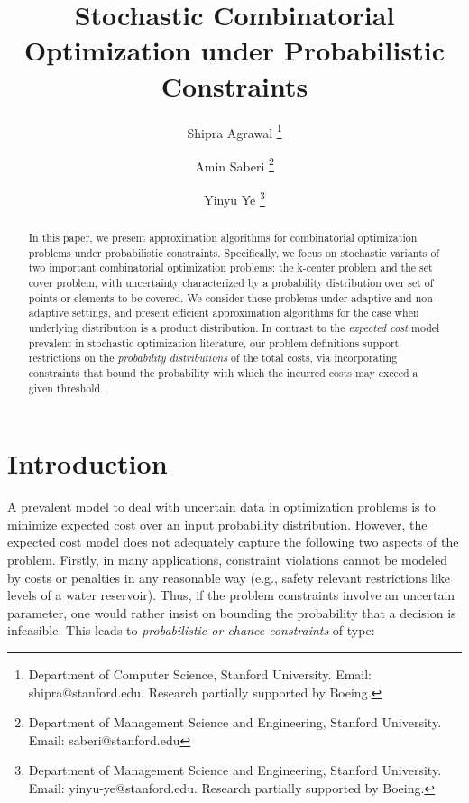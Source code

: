 \documentclass[11pt,onecolumn]{article}
\newcommand{\newtext}[1]{{#1}}
\begin{document}
\title{Stochastic Combinatorial Optimization under Probabilistic Constraints}
\author{
Shipra Agrawal \thanks{Department of Computer Science, Stanford University. 
Email: shipra@stanford.edu. Research partially supported by Boeing.}
    \and 
Amin Saberi \thanks{Department of Management Science and Engineering, Stanford University. Email: saberi@stanford.edu}
\and
Yinyu Ye \thanks{Department of Management Science and Engineering,
Stanford University. 
Email: yinyu-ye@stanford.edu. Research partially supported by Boeing.}
} 
\maketitle
\date{ }
\begin{abstract}
{\small
In this paper, we present approximation algorithms for combinatorial optimization problems under probabilistic constraints. Specifically, we focus on stochastic variants of two important combinatorial optimization problems: the k-center problem and the set cover problem, with uncertainty characterized by a probability distribution over set of points or elements to be covered. 
We consider these problems under adaptive and non-adaptive settings, and present efficient approximation algorithms for the case when underlying distribution is a product distribution. 
\newtext{In contrast to the {\it expected cost} model prevalent in stochastic optimization literature, our problem definitions support restrictions on the {\it probability distributions} of the total costs, via incorporating constraints that bound the probability with which the incurred costs may exceed a given threshold}. 
}
\end{abstract}
\section{Introduction}
\label{Intro}
\newtext{A prevalent model to deal with uncertain data in optimization problems is to minimize expected cost over an input probability distribution. However, the expected cost model does not adequately capture the following two aspects of the problem. Firstly, in many applications, constraint violations cannot be modeled by costs or penalties in any reasonable way (e.g., safety relevant restrictions like levels of a water reservoir). Thus, if the problem constraints involve an uncertain parameter, one would rather insist on bounding the probability that a decision is infeasible.}
This leads to {\it probabilistic or chance constraints} of type:
  
\end{document}
